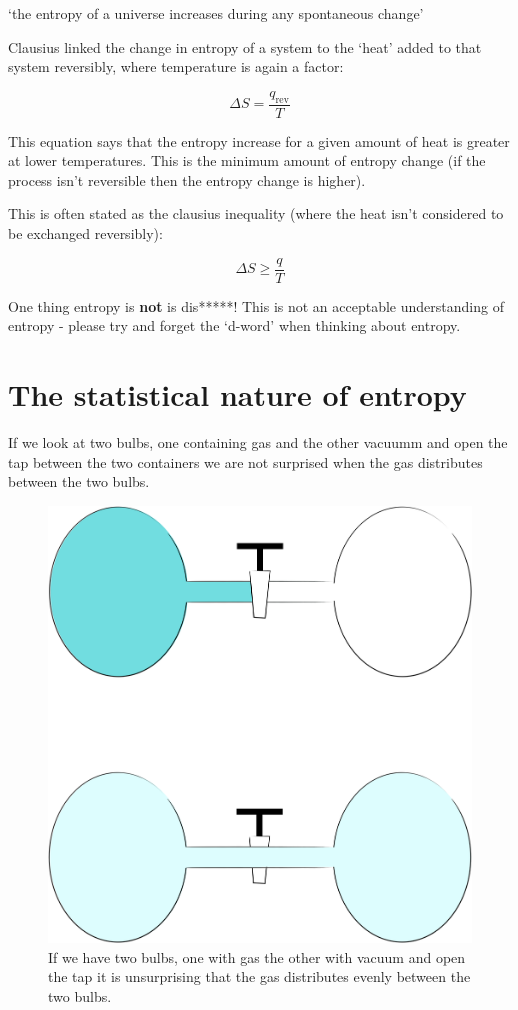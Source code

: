 \documentclass[
]{book}
\begin{document}
`the entropy of a universe increases during any spontaneous change'

Clausius linked the change in entropy of a system to the `heat' added to that system reversibly, where temperature is again a factor:

\begin{equation}
\Delta S=\frac{q_{\textrm{rev}}}{T}
\label{eq:clausius}
\end{equation}

This equation says that the entropy increase for a given amount of heat is greater at lower temperatures. This is the minimum amount of entropy change (if the process isn't reversible then the entropy change is higher).

This is often stated as the clausius inequality (where the heat isn't considered to be exchanged reversibly):

\begin{equation}
\Delta S \geq \frac {q}{T}
\label{eq:clausiusineq}
\end{equation}

One thing entropy is \textbf{not} is dis*****! This is not an acceptable understanding of entropy - please try and forget the `d-word' when thinking about entropy.

\hypertarget{the-statistical-nature-of-entropy}{%
\section{The statistical nature of entropy}\label{the-statistical-nature-of-entropy}}

If we look at two bulbs, one containing gas and the other vacuumm and open the tap between the two containers we are not surprised when the gas distributes between the two bulbs.

\begin{figure}

{\centering \includegraphics[width=0.5\linewidth]{images/gasdistribution} 

}

\caption{If we have two bulbs, one with gas the other with vacuum and open the tap it is unsurprising that the gas distributes evenly between the two bulbs.}\label{fig:gasdistribution}
\end{figure}
\end{document}
